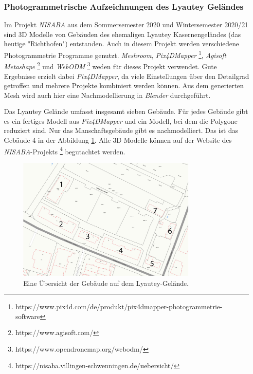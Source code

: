 \subsubsection{Photogrammetrische Aufzeichnungen des Lyautey Geländes}
Im Projekt \textit{NISABA} \cite{nisaba2021} aus dem Sommersemester 2020 und Wintersemester 2020/21 sind 3D Modelle von Gebäuden des ehemaligen Lyautey Kasernengeländes (das heutige "Richthofen") entstanden. Auch in diesem Projekt werden verschiedene Photogrammetrie Programme genutzt. \textit{Meshroom}, \textit{Pix4DMapper} \footnote{https://www.pix4d.com/de/produkt/pix4dmapper-photogrammetrie-software}, \textit{Agisoft Metashape} \footnote{https://www.agisoft.com/} und \textit{WebODM} \footnote{https://www.opendronemap.org/webodm/} weden für dieses Projekt verwendet. Gute Ergebnisse erzielt dabei \textit{Pix4DMapper}, da viele Einstellungen über den Detailgrad getroffen und mehrere Projekte kombiniert werden können. Aus dem generierten Mesh wird auch hier eine Nachmodellierung in \textit{Blender} durchgeführt.

Das Lyautey Gelände umfasst insgesamt sieben Gebäude. Für jedes Gebäude gibt es ein fertiges Modell aus \textit{Pix4DMapper} und ein Modell, bei dem die Polygone reduziert sind. Nur das Manschaftsgebäude gibt es nachmodelliert. Das ist das Gebäude 4 in der Abbildung \ref{fig:lyautey-map}. Alle 3D Modelle können auf der Website des \textit{NISABA}-Projekts \footnote{https://nisaba.villingen-schwenningen.de/uebersicht/} begutachtet werden. 

\begin{figure}[h]
    \centering
    \includegraphics[width=0.8\textwidth]{img/vorangegangene_Projekte/lyautey_map.jpg}
    \caption{Eine Übersicht der Gebäude auf dem Lyautey-Gelände.}
    \label{fig:lyautey-map}
\end{figure}


